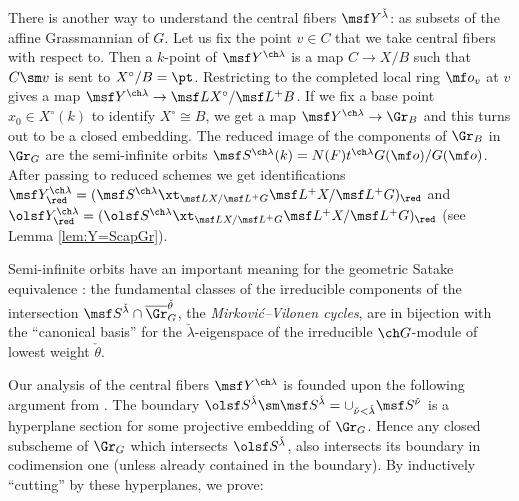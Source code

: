 There is another way to understand the central fibers $\msf Y^{\check\lambda}$: as subsets of the affine Grassmannian of $G$.
Let us fix the point $v \in C$ that we take central fibers with respect to.
Then a $k$-point of $\msf Y^{\ch\lambda}$ is a map $C \to X/B$ such that $C\sm v$ is sent to $X^\circ/B=\pt$.
Restricting to the completed local ring $\mf o_v$ at $v$ gives a map
$\msf Y^{\ch\lambda} \to \msf L X^\circ / \msf L^+B$.
If we fix a base point $x_0\in X^\circ(k)$ to identify $X^\circ \cong B$, we get a map
$\msf Y^{\ch\lambda} \to \Gr_B$ and this turns out to be a closed embedding.
The reduced image of the components of $\Gr_B$ in $\Gr_G$ are the
semi-infinite orbits $\msf S^{\ch\lambda}(k) = N(F) t^{\ch\lambda} G(\mf o)/G(\mf o)$.
After passing to reduced schemes we get identifications
$\msf Y^{\ch\lambda}_\red = (\msf S^{\ch\lambda} \xt_{\msf L X/ \msf L^+G} \msf L^+ X / \msf L^+G)_\red$
and $\olsf Y^{\ch\lambda}_\red = (\olsf S^{\ch\lambda} \xt_{\msf L X /\msf L^+G} \msf L^+ X / \msf L^+ G)_\red$ (see Lemma \ref{lem:Y=ScapGr}).



Semi-infinite orbits have an important meaning for the geometric Satake equivalence \cite{MV}: the fundamental classes of the irreducible components of the intersection $\msf S^{\check\lambda} \cap \overline\Gr_G^{\check\theta}$, the \emph{Mirkovi\'c--Vilonen cycles}, are in bijection with the ``canonical basis'' for the $\check\lambda$-eigenspace of the irreducible $\ch G$-module of lowest weight $\check\theta$.



Our analysis of the central fibers $\msf Y^{\ch\lambda}$ is founded upon the following argument from
\cite[\S 3]{MV}.
The boundary $\olsf S^{\check\lambda}\sm \msf S^{\check\lambda} = \cup_{\check\nu<\check\lambda} \msf S^{\check\nu}$ is a hyperplane section for some projective embedding of $\Gr_G$.
Hence any closed subscheme of $\Gr_G$ which intersects $\olsf S^{\check\lambda}$, also intersects its boundary in codimension one (unless already contained in the boundary). By inductively ``cutting'' by these hyperplanes,
we prove:

